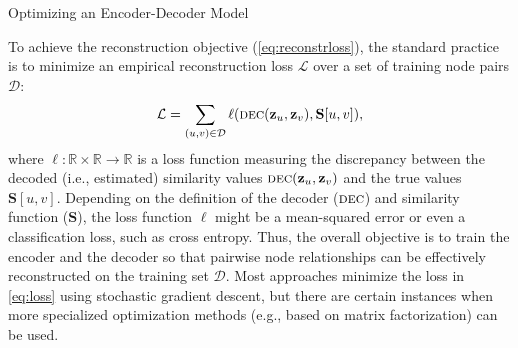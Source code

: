 \documentclass[10pt, aspectratio=169, compress, protectframetitle, handout]{beamer}
\begin{document}
\begin{frame}{Optimizing an Encoder-Decoder Model}

    To achieve the reconstruction objective (\autoref{eq:reconstrloss}), the standard practice is to minimize an empirical reconstruction loss $\mathcal L$ over a set of training node pairs $\mathcal D$:
    \begin{equation}
        \mathcal L = \sum_{(u,v) \in \mathcal D} \ell (\textsc{dec}(\mathbf z_u, \mathbf z_v), \mathbf S[u, v]),
        \label{eq:loss}
    \end{equation}
    where $\ell: \mathbb R \times \mathbb R \rightarrow \mathbb R$ is a loss function measuring the discrepancy between the decoded (i.e., estimated) similarity values $\textsc{dec}(\mathbf z_u, \mathbf z_v)$ and the true values $\mathbf S[u, v]$. Depending on the definition of the decoder ($\textsc{dec}$) and similarity function ($\mathbf S$), the loss function $\ell$ might be a mean-squared error or even a classification loss, such as cross entropy. Thus, the overall objective is to train the encoder and the decoder so that pairwise node relationships can be effectively reconstructed on the training set $\mathcal D$. Most approaches minimize the loss in \autoref{eq:loss} using stochastic gradient descent, but there are certain instances when more specialized optimization methods (e.g., based on matrix factorization) can be used.
    
\end{frame}
\end{document}
